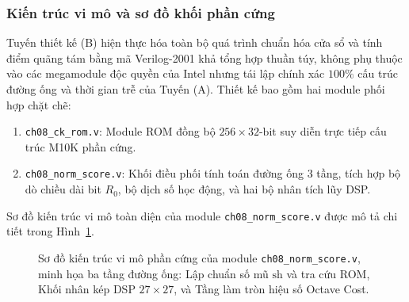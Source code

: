 \subsubsection*{Kiến trúc vi mô và sơ đồ khối phần cứng}
Tuyến thiết kế (B) hiện thực hóa toàn bộ quá trình chuẩn hóa cửa sổ và tính điểm quãng tám bằng mã Verilog-2001 khả tổng hợp thuần túy, không phụ thuộc vào các megamodule độc quyền của Intel nhưng tái lập chính xác $100\%$ cấu trúc đường ống và thời gian trễ của Tuyến (A). Thiết kế bao gồm hai module phối hợp chặt chẽ:
\begin{enumerate}[leftmargin=1.5em, itemsep=2pt]
    \item \texttt{ch08\_ck\_rom.v}: Module ROM đồng bộ $256 \times 32\text{-bit}$ suy diễn trực tiếp cấu trúc M10K phần cứng.
    \item \texttt{ch08\_norm\_score.v}: Khối điều phối tính toán đường ống 3 tầng, tích hợp bộ dò chiều dài bit $R_0$, bộ dịch số học động, và hai bộ nhân tích lũy DSP.
\end{enumerate}

Sơ đồ kiến trúc vi mô toàn diện của module \texttt{ch08\_norm\_score.v} được mô tả chi tiết trong Hình~\ref{fig:ch08_norm_arch}.

\begin{figure}[htbp]
\centering
\resizebox{0.98\textwidth}{!}{}
\caption{Sơ đồ kiến trúc vi mô phần cứng của module \texttt{ch08\_norm\_score.v}, minh họa ba tầng đường ống: Lập chuẩn số mũ $\text{sh}$ và tra cứu ROM, Khối nhân kép DSP $27 \times 27$, và Tầng làm tròn hiệu số Octave Cost.}
\label{fig:ch08_norm_arch}
\end{figure}


